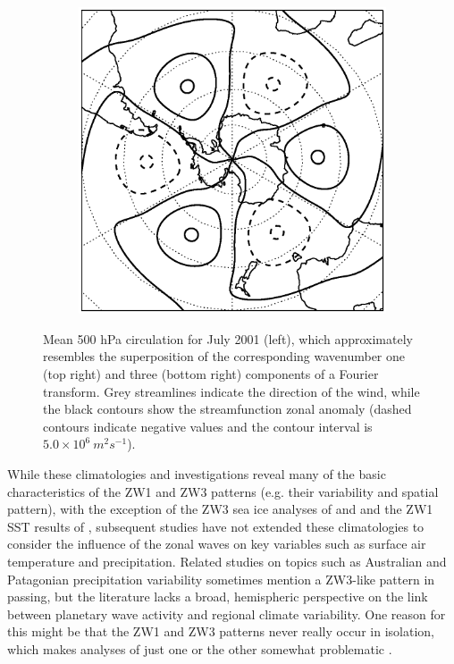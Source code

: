\begin{figure}
\begin{subfigure}[c]{0.289\textwidth}
\vspace{2ex}

\includegraphics[width=\textwidth]{figures/zonalwaves/example-wave3-sf-zonal-anom_2001-07-16.eps}
\end{subfigure}
\caption[Mean 500 hPa circulation for July 2001 and the corresponding wavenumber one and three components of a Fourier transform]{\label{fig:zw_example}
Mean 500 hPa circulation for July 2001 (left), which approximately resembles the superposition of the corresponding wavenumber one (top right) and three (bottom right) components of a Fourier transform. Grey streamlines indicate the direction of the wind, while the black contours show the streamfunction zonal anomaly (dashed contours indicate negative values and the contour interval is $5.0 \times 10^6 \: m^2 s^{-1}$).%
}
\end{figure}


While these climatologies and investigations reveal many of the basic characteristics of the ZW1 and ZW3 patterns (e.g. their variability and spatial pattern), with the exception of the ZW3 sea ice analyses of \citet{Raphael2007} and \citet{Yuan2008} and the ZW1 SST results of \citet{Hobbs2007}, subsequent studies have not extended these climatologies to consider the influence of the zonal waves on key variables such as surface air temperature and precipitation. Related studies on topics such as Australian \citep{Frederiksen2014} and Patagonian \citep{Garreaud2013} precipitation variability sometimes mention a ZW3-like pattern in passing, but the literature lacks a broad, hemispheric perspective on the link between planetary wave activity and regional climate variability. One reason for this might be that the ZW1 and ZW3 patterns never really occur in isolation, which makes analyses of just one or the other somewhat problematic \citep{Hobbs2010}.

